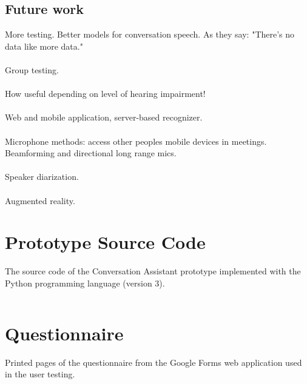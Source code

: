 \documentclass[english, 12pt, a4paper, pdftex, elec, utf8]{aaltothesis}
\begin{document}
\subsection{Future work}

More testing. Better models for conversation speech. As they say: "There's no data like more data." \\\\
Group testing. \\\\
How useful depending on level of hearing impairment! \\\\
Web and mobile application, server-based recognizer. \\\\
Microphone methods: access other peoples mobile devices in meetings. Beamforming and directional long range mics. \\\\
Speaker diarization. \\\\
Augmented reality.

\clearpage




\clearpage

\appendix

\section{Prototype Source Code} \label{sec:proto}

The source code of the Conversation Assistant prototype implemented with the Python programming language (version 3).

\inputminted[fontsize=\scriptsize]{python}{keskusteluavustin.py} %

\clearpage

\section{Questionnaire} \label{sec:kysely}

Printed pages of the questionnaire from the Google Forms web application used in the user testing.
\end{document}
